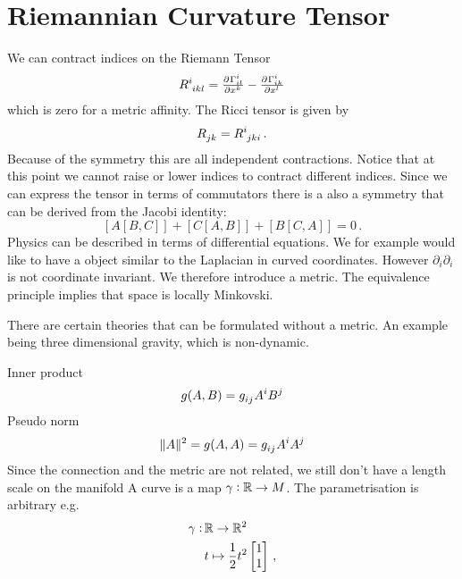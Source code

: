 \section{Riemannian Curvature Tensor}
We can contract indices on the Riemann Tensor
\begin{equation}
\tensor{R}{^i_i_k_l}=\pd{{\Gamma^i_{il}}}{{x^k}}-\pd{{\Gamma^i_{ik}}}{{x^l}}
\end{equation}
which is zero for a metric affinity. The Ricci tensor is given by
\begin{equation}
\tensor{R}{_j_k}=\tensor{R}{^i_j_k_i}\, .
\end{equation}
Because of the symmetry this are all independent contractions. Notice that at
this point we cannot raise or lower indices to contract different indices.
Since we can express the  tensor in terms of commutators there is
a also a symmetry that can be derived from the Jacobi identity:
\begin{equation}
\left[A\left[B,C\right]\right]
+\left[C\left[A,B\right]\right]
+\left[B\left[C,A\right]\right]=0\,.
\end{equation}
Physics can be described in terms of differential equations. We for example
would like to have a object similar to the Laplacian in curved coordinates.
However $\partial_i\partial_i$ is not coordinate invariant. We therefore
introduce a metric. The equivalence principle implies that space is locally
Minkovski.
\begin{sidenote}
There are certain theories that can be formulated without a metric. An example
being three dimensional gravity, which is non-dynamic. 
\end{sidenote}
Inner product 
\begin{equation}
g(A,B)=\tensor{g}{_i_j}\tensor{A}{^i}\tensor{B}{^j}
\end{equation}
Pseudo norm
\begin{equation}
\|A\|^2=g(A,A)=\tensor{g}{_i_j}\tensor{A}{^i}\tensor{A}{^j}
\end{equation}
Since the connection and the metric are not related, we still don't have a length
scale on the manifold
A curve is a map $\gamma:\mathbb{R}\to M$. The parametrisation is arbitrary e.g.
\begin{equation}
\begin{split}
\gamma:\, &\mathbb{R}\to \mathbb{R}^2\\
& t\mapsto
\frac{1}{2} t^2
\begin{bmatrix}
1 \\
1
\end{bmatrix}\, ,
\end{split}
\end{equation}
